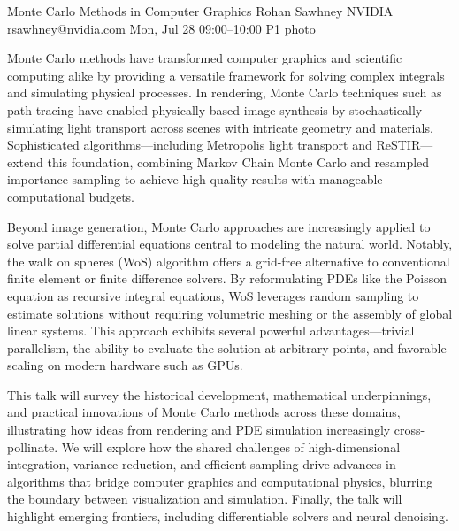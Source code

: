 \documentclass[12pt,lettersize,oneside]{book} %
\begin{document}
\begin{talk}
  {Monte Carlo Methods in Computer Graphics}%
  {Rohan Sawhney}%
  {NVIDIA}%
  {rsawhney@nvidia.com}%
  {}%
  {}%
  {Mon, Jul 28 09:00--10:00}%
  {P1}%
  {photo}%
  {}%
  
    
   
Monte Carlo methods have transformed computer graphics and scientific computing alike by providing a versatile framework for solving complex integrals and simulating physical processes. In rendering, Monte Carlo techniques such as path tracing have enabled physically based image synthesis by stochastically simulating light transport across scenes with intricate geometry and materials. Sophisticated algorithms---including Metropolis light transport and ReSTIR---extend this foundation, combining Markov Chain Monte Carlo and resampled importance sampling to achieve high-quality results with manageable computational budgets.

Beyond image generation, Monte Carlo approaches are increasingly applied to solve partial differential equations central to modeling the natural world. Notably, the walk on spheres (WoS) algorithm offers a grid-free alternative to conventional finite element or finite difference solvers. By reformulating PDEs like the Poisson equation as recursive integral equations, WoS leverages random sampling to estimate solutions without requiring volumetric meshing or the assembly of global linear systems. This approach exhibits several powerful advantages---trivial parallelism, the ability to evaluate the solution at arbitrary points, and favorable scaling on modern hardware such as GPUs.

This talk will survey the historical development, mathematical underpinnings, and practical innovations of Monte Carlo methods across these domains, illustrating how ideas from rendering and PDE simulation increasingly cross-pollinate. We will explore how the shared challenges of high-dimensional integration, variance reduction, and efficient sampling drive advances in algorithms that bridge computer graphics and computational physics, blurring the boundary between visualization and simulation. Finally, the talk will highlight emerging frontiers, including differentiable solvers and neural denoising.



\end{talk}
\end{document}
